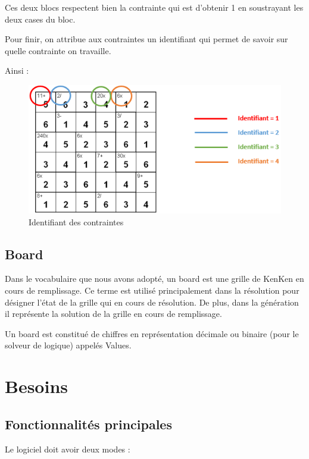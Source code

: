 \documentclass[1]{report}
\begin{document}
    Ces deux blocs respectent bien la contrainte qui est d’obtenir 1 en soustrayant les deux cases du bloc.

    
    Pour finir, on attribue aux contraintes un identifiant qui permet de savoir sur quelle contrainte on travaille. \newline
    
    Ainsi :
    
    \begin{figure}[h]
    \centering
        \includegraphics[scale=0.9]{identifiant_contrainte.PNG}
        \caption{Identifiant des contraintes}
    \end{figure}

    \section{Board}
    
Dans le vocabulaire que nous avons adopté, un board est une grille de KenKen en cours de remplissage. Ce terme est utilisé principalement dans la résolution pour désigner l'état de la grille qui en cours de résolution. De plus, dans la génération il représente la  solution de la grille en cours de remplissage.\par
Un board est constitué de chiffres en représentation décimale ou binaire (pour le solveur de logique) appelés Values.


\chapter{Besoins}

    \section{Fonctionnalités principales}
    
    Le logiciel doit avoir deux modes : \newline
    
\end{document}
